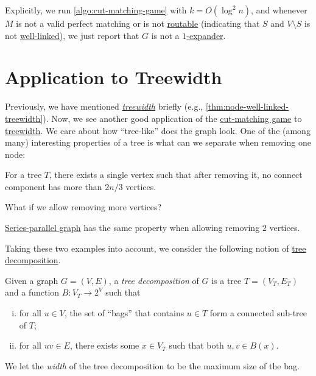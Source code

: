 \begin{note}
	Explicitly, we run \autoref{algo:cut-matching-game} with \(k = O(\log ^2 n)\), and whenever \(M\) is not a valid perfect matching or is not \hyperref[def:routable]{routable} (indicating that \(S\) and \(V\setminus S\) is not \hyperref[def:well-linked]{well-linked}), we just report that \(G\) is not a \hyperref[def:expander]{\(1\)-expander}.
\end{note}

\section{Application to Treewidth}
Previously, we have mentioned \emph{\hyperref[def:treewidth]{treewidth}} briefly (e.g., \autoref{thm:node-well-linked-treewidth}). Now, we see another good application of the \hyperref[def:cut-matching-game]{cut-matching game} to \hyperref[def:treewidth]{treewidth}. We care about how ``tree-like'' does the graph look. One of the (among many) interesting properties of a tree is what can we separate when removing one node:

\begin{eg}[Tree]
	For a tree \(T\), there exists a single vertex such that after removing it, no connect component has more than \(2 n/ 3\) vertices.
\end{eg}

What if we allow removing more vertices?

\begin{eg}
	\href{https://en.wikipedia.org/wiki/Series%E2%80%93parallel_graph}{Series-parallel graph} has the same property when allowing removing \(2\) vertices.
\end{eg}

Taking these two examples into account, we consider the following notion of \hyperref[def:tree-decomposition]{tree decomposition}.

\begin{definition}\label{def:tree-decomposition}
	Given a graph \(G = (V, E)\), a \emph{tree decomposition} of \(G\) is a tree \(T = (V_T, E_T)\) and a function \(B \colon V_T \to 2^V\) such that
	\begin{enumerate}[(i)]
		\item for all \(u \in V\), the set of ``bags'' that contains \(u \in T\) form a connected sub-tree of \(T\);
		\item for all \(uv \in E\), there exists some \(x \in V_T\) such that both \(u, v \in B(x)\).
	\end{enumerate}
	We let the \emph{width} of the tree decomposition to be the maximum size of the bag.
\end{definition}


